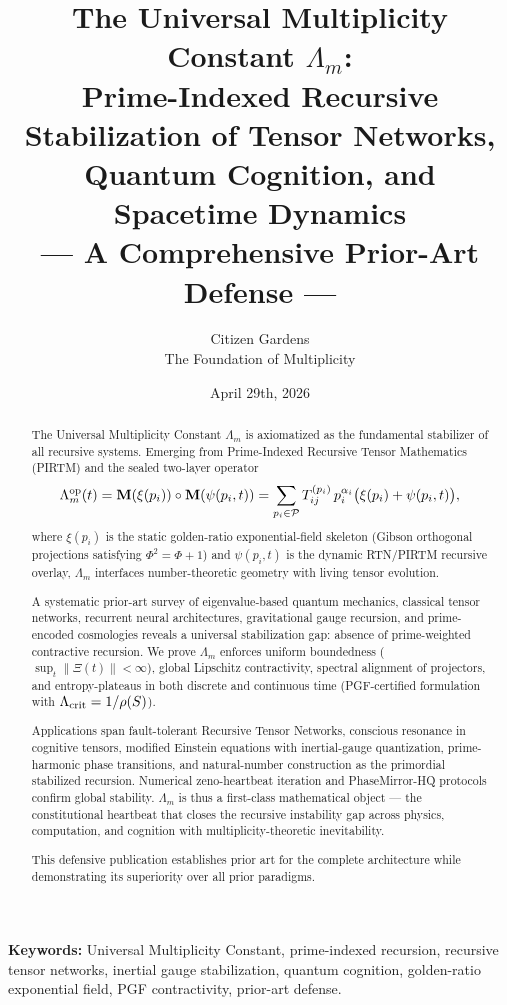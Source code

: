 \documentclass[11pt, a4paper]{article}
\title{The Universal Multiplicity Constant \(\Lambda_m\): \\ Prime-Indexed Recursive Stabilization of Tensor Networks, Quantum Cognition, and Spacetime Dynamics \\ --- A Comprehensive Prior-Art Defense ---}
\author{Citizen Gardens \\ The Foundation of Multiplicity}
\date{April 29th, 2026}
\begin{document}
\maketitle

\begin{abstract}
The Universal Multiplicity Constant \(\Lambda_m\) is axiomatized as the fundamental stabilizer of all recursive systems. Emerging from Prime-Indexed Recursive Tensor Mathematics (PIRTM) and the sealed two-layer operator
\[
\Lambda_m^{\rm op}(t) = \mathbf{M}(\xi(p_i)) \circ \mathbf{M}(\psi(p_i,t)) = \sum_{p_i \in \mathcal{P}} T_{ij}^{(p_i)} \, p_i^{\alpha_i} \bigl( \xi(p_i) + \psi(p_i,t) \bigr),
\]
where \(\xi(p_i)\) is the static golden-ratio exponential-field skeleton (Gibson orthogonal projections satisfying \(\Phi^2 = \Phi + 1\)) and \(\psi(p_i,t)\) is the dynamic RTN/PIRTM recursive overlay, \(\Lambda_m\) interfaces number-theoretic geometry with living tensor evolution.

A systematic prior-art survey of eigenvalue-based quantum mechanics, classical tensor networks, recurrent neural architectures, gravitational gauge recursion, and prime-encoded cosmologies reveals a universal stabilization gap: absence of prime-weighted contractive recursion. We prove \(\Lambda_m\) enforces uniform boundedness (\(\sup_t \|\Xi(t)\| < \infty\)), global Lipschitz contractivity, spectral alignment of projectors, and entropy-plateaus in both discrete and continuous time (PGF-certified formulation with \(\Lambda_{\rm crit} = 1/\rho(S)\)).

Applications span fault-tolerant Recursive Tensor Networks, conscious resonance in cognitive tensors, modified Einstein equations with inertial-gauge quantization, prime-harmonic phase transitions, and natural-number construction as the primordial stabilized recursion. Numerical zeno-heartbeat iteration and PhaseMirror-HQ protocols confirm global stability. \(\Lambda_m\) is thus a first-class mathematical object --- the constitutional heartbeat that closes the recursive instability gap across physics, computation, and cognition with multiplicity-theoretic inevitability.

This defensive publication establishes prior art for the complete architecture while demonstrating its superiority over all prior paradigms.
\end{abstract}

\textbf{Keywords:} Universal Multiplicity Constant, prime-indexed recursion, recursive tensor networks, inertial gauge stabilization, quantum cognition, golden-ratio exponential field, PGF contractivity, prior-art defense.
\newpage
\tableofcontents
\newpage
\end{document}
